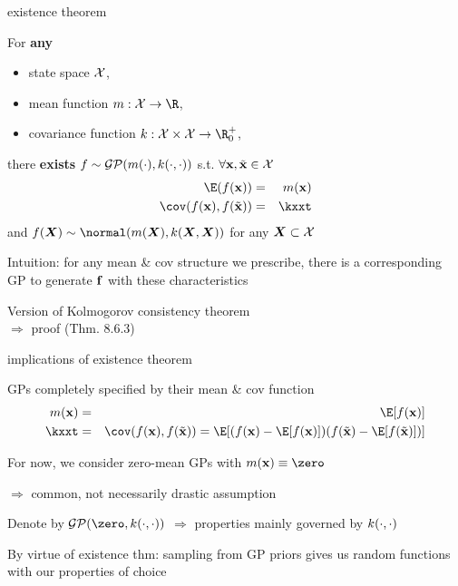 \documentclass[11pt,compress,t,notes=noshow, xcolor=table]{beamer}
\begin{document}
\begin{framei}[sep=L]{existence theorem}
\item For \textbf{any} 
\begin{itemize}
\item state space $\mathcal{X}$,
\item mean function $m: \Xspace \rightarrow \R$,
\item covariance function $k: \Xspace \times \Xspace \rightarrow \R^+_0$, 
\end{itemize}
\vfill
there \textbf{exists} $f \sim \mathcal{GP}(m(\cdot), k(\cdot, \cdot))$ s.t. $\forall \mathbf{x}, \tilde{\mathbf{x}} \in \mathcal{X}$
\begin{eqnarray*}
\E(\fx) &=& m(\xv) \\
\cov(\fx, f(\xtil)) &=& \kxxt
\end{eqnarray*}
and $f(\bm{X}) \sim \normal(m(\bm{X}), k(\bm{X}, \bm{X}))$ for any $\bm{X} \subset \mathcal{X}$
\item Intuition: for any mean \& cov structure we prescribe, there is a corresponding GP to generate $\mathbf{f}$ with these characteristics
\item Version of Kolmogorov consistency theorem \\$\Rightarrow$ proof  (Thm. 8.6.3)
\end{framei}

\begin{framei}[sep=L]{implications of existence theorem}
\item GPs completely specified by their mean \& cov function
\begin{eqnarray*}
m(\xv) &=& \E[f(\xv)] \\
\kxxt &=& \cov(\fx, f(\xtil)) = \E [( f(\xv) - \E[f(\xv)]) ( f(\xtil) - \E[f(\xtil)] )]
\end{eqnarray*}
\item For now, we consider zero-mean GPs with $m(\xv) \equiv \zero$ 

$\Rightarrow$ common, not necessarily drastic assumption 
\item Denote by $\GPzk$ $\Rightarrow$ properties mainly governed by $k(\cdot, \cdot)$
\item By virtue of existence thm: sampling from GP priors gives us random functions with our properties of choice
\end{framei}
\end{document}
